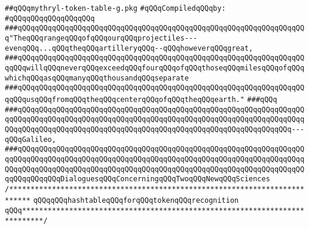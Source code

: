 \label{src/lib/compiler/front/parser/lex/mythryl-token-table-g.pkg}
\verb|##qQQqmythryl-token-table-g.pkg|\newline
\newline
\verb|#qQQqCompiledqQQqby:|\newline
\verb|#qQQqqQQqqQQqqQQqqQQq|\newline
\newline
\newline
\newline
\verb|###qQQqqQQqqQQqqQQqqQQqqQQqqQQqqQQqqQQqqQQqqQQqqQQqqQQqqQQqqQQqqQQqqQQq"TheqQQqrangeqQQqofqQQqourqQQqprojectiles---evenqQQq...qQQqtheqQQqartilleryqQQq--qQQqhoweverqQQqgreat,|\newline
\verb|###qQQqqQQqqQQqqQQqqQQqqQQqqQQqqQQqqQQqqQQqqQQqqQQqqQQqqQQqqQQqqQQqqQQqqQQqwillqQQqneverqQQqexceedqQQqfourqQQqofqQQqthoseqQQqmilesqQQqofqQQqwhichqQQqasqQQqmanyqQQqthousandqQQqseparate|\newline
\verb|###qQQqqQQqqQQqqQQqqQQqqQQqqQQqqQQqqQQqqQQqqQQqqQQqqQQqqQQqqQQqqQQqqQQqqQQqusqQQqfromqQQqtheqQQqcenterqQQqofqQQqtheqQQqearth."|\newline
\verb|###qQQq|\newline
\verb|###qQQqqQQqqQQqqQQqqQQqqQQqqQQqqQQqqQQqqQQqqQQqqQQqqQQqqQQqqQQqqQQqqQQqqQQqqQQqqQQqqQQqqQQqqQQqqQQqqQQqqQQqqQQqqQQqqQQqqQQqqQQqqQQqqQQqqQQqqQQqqQQqqQQqqQQqqQQqqQQqqQQqqQQqqQQqqQQqqQQqqQQqqQQqqQQqqQQqqQQqqQQq---qQQqGalileo,|\newline
\verb|###qQQqqQQqqQQqqQQqqQQqqQQqqQQqqQQqqQQqqQQqqQQqqQQqqQQqqQQqqQQqqQQqqQQqqQQqqQQqqQQqqQQqqQQqqQQqqQQqqQQqqQQqqQQqqQQqqQQqqQQqqQQqqQQqqQQqqQQqqQQqqQQqqQQqqQQqqQQqqQQqqQQqqQQqqQQqqQQqqQQqqQQqqQQqqQQqqQQqqQQqqQQqqQQqqQQqqQQqqQQqDialoguesqQQqConcerningqQQqTwoqQQqNewqQQqSciences|\newline
\newline
\newline
\newline
\verb|/***************************************************************************|\newline
\newline
\verb|qQQqqQQqhashtableqQQqforqQQqtokenqQQqrecognition|\newline
\newline
\verb|qQQq***************************************************************************/|\newline
\newline
\newline
